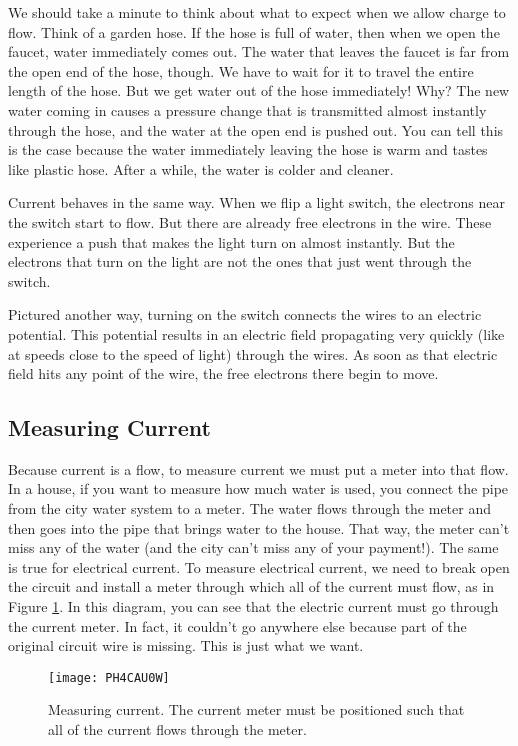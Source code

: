 We should take a minute to think about what to expect when we allow charge
to flow. Think of a garden hose. If the hose is full of water, then when we
open the faucet, water immediately comes out. The water that leaves the
faucet is far from the open end of the hose, though. We have to wait for it
to travel the entire length of the hose. But we get water out of the hose
immediately! Why? 
The new water coming in causes a
pressure change that is transmitted almost instantly 
through the hose, and the water at the open
end is pushed out. You can tell this is the case because the water
immediately leaving the hose is warm and tastes like plastic hose. After a
while, the water is colder and cleaner.

Current behaves in the same way. When we flip a light switch, the
electrons near the switch start to flow. But there are already free
electrons in the wire. These experience a push that makes the light turn on
almost instantly. But the electrons that turn on the light are not the ones
that just went through the switch.

Pictured another way, turning on the switch connects the wires to an electric
potential. This potential results in an electric field propagating very 
quickly (like at speeds close to the speed of light) through the wires. As 
soon as that electric field hits any point of the wire, the free 
electrons there begin to move.

\subsection{Measuring Current}

Because current is a flow, to measure current we must put a meter into that
flow. In a house, if you want to measure how much water is used, you connect
the pipe from the city water system to a meter. The water flows through the
meter and then goes into the pipe that brings water to the house. That way,
the meter can't miss any of the water (and the city can't miss any of your
payment!). The same is true for electrical current. To measure electrical
current, we need to break open the circuit and install a meter through which
all of the current must flow, as in Figure \ref{fig:measuring_current}.
In this diagram, you can see that
the electric current must go through the current meter. In fact, it couldn't
go anywhere else because part of the original circuit wire is missing. This
is just what we want. 
\begin{figure}[htbp!]
\centering
\texttt{[image: PH4CAU0W]}
\caption[Measuring current]{Measuring current. The current meter must
be positioned such that all of the current flows through the meter.}
\label{fig:measuring_current}
\end{figure}

